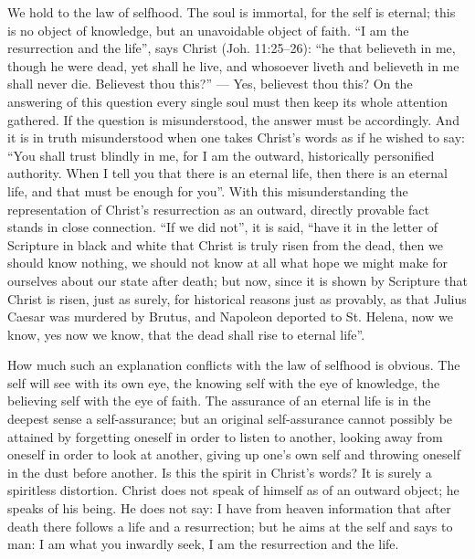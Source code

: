 \documentclass[12pt,a4paper,openany]{book}
\newcommand{\opage}[1]{\marginnote{\footnotesize\textit{[#1]}}}
\begin{document}
We hold to the law of selfhood.  The soul is immortal,
for the self is eternal; this is no object of knowledge,
but an unavoidable object of faith.  ``I am the resurrection
and the life'', says Christ (Joh. 11:25--26): ``he
that believeth in me, though he were dead, yet shall he live, and
whosoever liveth and believeth in me shall never
die.  Believest thou this?'' --- Yes, believest thou this?
On the answering of this question every single
soul must then keep its whole attention gathered.  If
the question is misunderstood, the answer must be accordingly.
And it is in truth misunderstood when one
takes Christ's words as if he wished to say: ``You shall
trust blindly in me, for I am the outward, historically
personified authority.  When I tell you that there is
an eternal life, then there is an eternal life, and that must be
enough for you''.  With this misunderstanding the representation
of Christ's resurrection as an outward, directly provable
fact stands in close connection.  ``If we did not'',
it is said, ``have it in the letter of Scripture in black and white
that Christ is truly risen from the dead, then
we should know nothing, we should not know at all what hope we might
make for ourselves about our state after death; but now, since it
is shown by Scripture that Christ is risen, just as surely,
for historical reasons just as provably, as that Julius
Caesar was murdered by Brutus, and Napoleon deported
to St. Helena, now we know, yes now we know, that the
dead shall rise to eternal life''.

\setcounter{footnote}{0}%
\opage{212}How much such an explanation conflicts with the law of selfhood
is obvious.  The self will see with its own
eye, the knowing self with the eye of knowledge, the believing self with the
eye of faith.  The assurance of an eternal life is in the deepest
sense a self-assurance; but an original self-assurance
cannot possibly be attained by forgetting oneself in order to
listen to another, looking away from oneself in order to look
at another, giving up one's own self and throwing oneself in the dust
before another.  Is this the spirit in Christ's words?  It is
surely a spiritless distortion.  Christ does not speak of himself
as of an outward object; he speaks of his
being.  He does not say: I have from heaven information
that after death there follows a life and a resurrection;
but he aims at the self and says to man:
I am what you inwardly seek, I am the resurrection
and the life.
\end{document}
